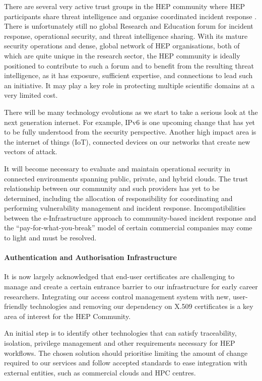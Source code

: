 There are several very active trust groups in the HEP community where
HEP participants share threat intelligence and organise coordinated
incident response \cite{EGI-CSIRT,REN-ISAC,XSEDE}.
There is unfortunately still no global Research and Education forum for
incident response, operational security, and threat intelligence
sharing. With its mature security operations and dense, global network
of HEP organisations, both of which are quite unique in the research
sector, the HEP community is ideally positioned to contribute to such a
forum and to benefit from the resulting threat intelligence, as it has
exposure, sufficient expertise, and connections to lead such an
initiative. It may play a key role in protecting multiple scientific
domains at a very limited cost.

There will be many technology evolutions as we start to take a serious
look at the next generation internet. For example, IPv6 is one upcoming
change that has yet to be fully understood from the security
perspective. Another high impact area is the internet of things (IoT),
connected devices on our networks that create new vectors of attack.

It will become necessary to evaluate and maintain operational security
in connected environments spanning public, private, and hybrid clouds.
The trust relationship between our community and such providers has yet
to be determined, including the allocation of responsibility for
coordinating and performing vulnerability management and incident
response. Incompatibilities between the e-Infrastructure approach to
community-based incident response and the ``pay-for-what-you-break''
model of certain commercial companies may come to light and must be
resolved.

\paragraph{Authentication and Authorisation Infrastructure}

It is now largely acknowledged that end-user certificates are
challenging to manage and create a certain entrance barrier to our
infrastructure for early career researchers. Integrating our access
control management system with new, user-friendly technologies and
removing our dependency on X.509 certificates is a key area of interest
for the HEP Community.

An initial step is to identify other technologies that can satisfy
traceability, isolation, privilege management and other requirements
necessary for HEP workflows. The chosen solution should prioritise
limiting the amount of change required to our services and follow
accepted standards to ease integration with external entities, such as
commercial clouds and HPC centres.

